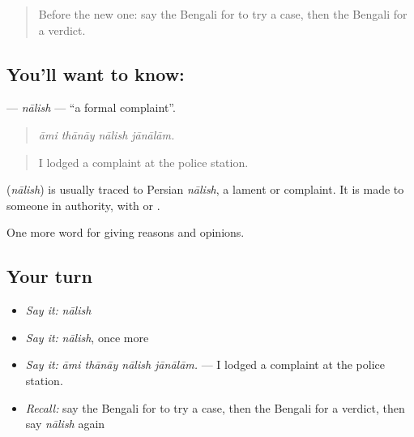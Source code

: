 \label{lesson:BN-C342-nalish}



\begin{quote}
Before the new one: say the Bengali for to try a case, then the Bengali for a verdict.
\end{quote}

\subsection*{You'll want to know: }
\textbf{} — \emph{nālish} — \textquotedblleft{}a formal complaint\textquotedblright{}.

\begin{quote}
   
\end{quote}

\begin{quote}
\emph{āmi thānāy nālish jānālām.}
\end{quote}

\begin{quote}
I lodged a complaint at the police station.
\end{quote}

\begin{cousinweb}
\textbf{} (\emph{nālish}) is usually traced to Persian \emph{nālish}, a lament or complaint. It is made to someone in authority, with  or .
\end{cousinweb}

\begin{grammarlens}[title={What you've built}]
One more word for giving reasons and opinions.
\end{grammarlens}

\subsection*{Your turn}
\begin{itemize}
\raggedright
  \item \emph{Say it:} \emph{nālish}
  \item \emph{Say it:} \emph{nālish}, once more
  \item \emph{Say it:} \emph{āmi thānāy nālish jānālām.} — I lodged a complaint at the police station.
  \item \emph{Recall:} say the Bengali for to try a case, then the Bengali for a verdict, then say \emph{nālish} again
\end{itemize}

